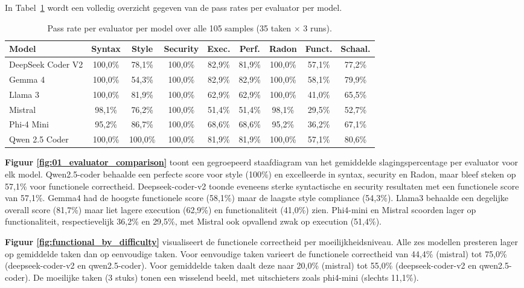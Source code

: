 In Tabel~\ref{tab:pass_rates} wordt een volledig overzicht gegeven van de pass rates per evaluator per model.

\begin{table}[htbp]
\centering
\small
\setlength{\tabcolsep}{3.5pt}
\begin{tabular}{lcccccccc}
\toprule
\textbf{Model} & \textbf{Syntax} & \textbf{Style} & \textbf{Security} & \textbf{Exec.} & \textbf{Perf.} & \textbf{Radon} & \textbf{Funct.} & \textbf{Schaal.} \\
\midrule
DeepSeek Coder V2 & 100,0\% & 78,1\% & 100,0\% & 82,9\% & 81,9\% & 100,0\% & 57,1\% & 77,2\% \\
Gemma 4           & 100,0\% & 54,3\% & 100,0\% & 82,9\% & 82,9\% & 100,0\% & 58,1\% & 79,9\% \\
Llama 3           & 100,0\% & 81,9\% & 100,0\% & 62,9\% & 62,9\% & 100,0\% & 41,0\% & 65,5\% \\
Mistral           &  98,1\% & 76,2\% & 100,0\% & 51,4\% & 51,4\% &  98,1\% & 29,5\% & 52,7\% \\
Phi-4 Mini        &  95,2\% & 86,7\% & 100,0\% & 68,6\% & 68,6\% &  95,2\% & 36,2\% & 67,1\% \\
Qwen 2.5 Coder    & 100,0\% & 100,0\% & 100,0\% & 81,9\% & 81,9\% & 100,0\% & 57,1\% & 80,6\% \\
\bottomrule
\end{tabular}
\caption{Pass rate per evaluator per model over alle 105 samples (35 taken $\times$ 3 runs).}
\label{tab:pass_rates}
\end{table}

\textbf{Figuur \ref{fig:01_evaluator_comparison}} toont een gegroepeerd staafdiagram van het gemiddelde slagingspercentage per evaluator voor elk model. Qwen2.5-coder behaalde een perfecte score voor style (100\%) en excelleerde in syntax, security en Radon, maar bleef steken op 57,1\% voor functionele correctheid. Deepseek-coder-v2 toonde eveneens sterke syntactische en security resultaten met een functionele score van 57,1\%. Gemma4 had de hoogste functionele score (58,1\%) maar de laagste style compliance (54,3\%). Llama3 behaalde een degelijke overall score (81,7\%) maar liet lagere execution (62,9\%) en functionaliteit (41,0\%) zien. Phi4-mini en Mistral scoorden lager op functionaliteit, respectievelijk 36,2\% en 29,5\%, met Mistral ook opvallend zwak op execution (51,4\%).

\textbf{Figuur \ref{fig:functional_by_difficulty}} visualiseert de functionele correctheid per moeilijkheidsniveau. Alle zes modellen presteren lager op gemiddelde taken dan op eenvoudige taken. Voor eenvoudige taken varieert de functionele correctheid van 44,4\% (mistral) tot 75,0\% (deepseek-coder-v2 en qwen2.5-coder). Voor gemiddelde taken daalt deze naar 20,0\% (mistral) tot 55,0\% (deepseek-coder-v2 en qwen2.5-coder). De moeilijke taken (3 stuks) tonen een wisselend beeld, met uitschieters zoals phi4-mini (slechts 11,1\%).

